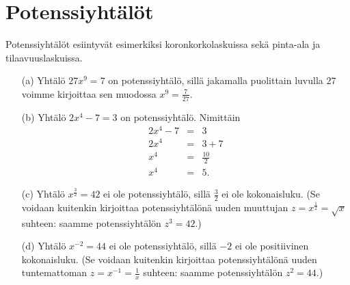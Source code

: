 \chapter{Potenssiyhtälöt}

Potenssiyhtälöt esiintyvät esimerkiksi koronkorkolaskuissa sekä pinta-ala ja tilaavuuslaskuissa.


\begin{esimerkki}
\begin{enumerate}
\item[(a)]
Yhtälö $27x^9=7$ on potenssiyhtälö, sillä jakamalla puolittain luvulla $27$
voimme kirjoittaa sen muodossa $x^9 = \frac{7}{27}$.
\item[(b)]
Yhtälö $2x^{4}-7=3$ on potenssiyhtälö. Nimittäin
\begin{eqnarray*}
2x^{4} -7 &=& 3 \\
2x^{4} &=& 3+7 \\
x^{4} &=& \frac{10}{2} \\
x^{4} &=& 5.
\end{eqnarray*}
\item[(c)]
Yhtälö $x^{\frac{3}{2}}=42$ ei ole potenssiyhtälö, sillä $\frac{3}{2}$ ei ole kokonaisluku. (Se voidaan kuitenkin kirjoittaa potenssiyhtälönä uuden muuttujan $z=x^{\frac{1}{2}}=\sqrt{x}$ suhteen: saamme potenssiyhtälön $z^3 = 42$.)
\item[(d)]
Yhtälö $x^{-2}=44$ ei ole potenssiyhtälö, sillä $-2$ ei ole positiivinen kokonaisluku. (Se voidaan kuitenkin kirjoittaa potenssiyhtälönä uuden tuntemattoman $z=x^{-1}=\frac{1}{x}$ suhteen: saamme potenssiyhtälön $z^2 = 44$.)
\end{enumerate}
\end{esimerkki}


